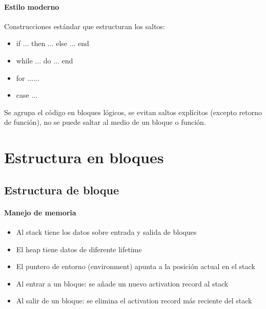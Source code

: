 \documentclass[10pt,a4paper]{report}
\begin{document}
            \subsubsection{Estilo moderno}
                \par Construcciones estándar que estructuran los saltos: 
            
                \begin{itemize}
                    \item if ... then ... else ... end 
                    \item while ... do ... end
                    \item for ...{...}
                    \item case ...
                \end{itemize}
                
            \par Se agrupa el código en bloques lógicos, se evitan saltos explícitos (excepto retorno de función), no se puede 
                saltar al medio de un bloque o función.


\chapter{Estructura en bloques}

\section{Estructura de bloque}
\subsubsection{Manejo de memoria}
        \begin{itemize}
            \item Al stack tiene los datos sobre entrada y salida de bloques
            \item El heap tiene datos de diferente lifetime
            \item El puntero de entorno (environment) apunta a la posición 
            actual en el stack
            \item Al entrar a un bloque: se añade un nuevo activation record al 
            stack
            \item Al salir de un bloque: se elimina el activation record más 
            reciente del stack
        \end{itemize}
        
\end{document}
